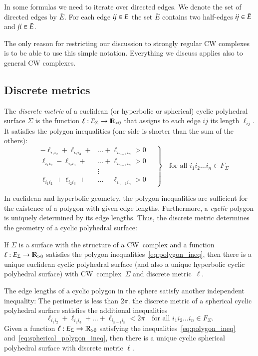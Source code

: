\documentclass[Thesis.tex]{subfiles}
\begin{document}
In some formulas we need to iterate over directed edges. We denote the set 
of directed edges by $\bar E$. For each edge $\it ij\in E$ the set $\bar E$
contains two half-edges $\it ij\in \bar E$ and $\it ji \in \bar E$.

The only reason for restricting our discussion to strongly regular CW
complexes is to be able to use this simple notation. Everything we
discuss applies also to general CW complexes.

\subsection{Discrete metrics}
\label{sec:discrete-metrics}

The \emph{discrete metric} of a euclidean (or hyperbolic or
spherical) cyclic polyhedral surface $\Sigma$ is the function
$\ell:E_{\Sigma}\rightarrow\mathbb R_{>0}$ that assigns to each edge $ij$ its
length $\ell_{ij}$. It satisfies the polygon inequalities (one side is
shorter than the sum of the others):
\begin{equation}
\label{eq:polygon_ineq}
\left.
\quad
\begin{aligned}
-\ell_{i_{1}i_{2}}+\ell_{i_{2}i_{3}}+&\ldots+\ell_{i_{n-1}i_{n}}
>0\\
\ell_{i_{1}i_{2}}-\ell_{i_{2}i_{3}}+&\ldots+\ell_{i_{n-1}i_{n}}
>0\\
&\vdots\\
\ell_{i_{1}i_{2}}+\ell_{i_{2}i_{3}}+&\ldots-\ell_{i_{n-1}i_{n}}
>0
\end{aligned}
\quad
\right\}
\quad
\text{for all $i_{1}i_{2}\ldots i_{n}\in F_{\Sigma}$}
\end{equation}

In euclidean and hyperbolic geometry, the polygon inequalities are
sufficient for the existence of a polygon with given edge
lengths. Furthermore, a \emph{cyclic} polygon is uniquely determined
by its edge lengths. Thus, the discrete metric determines the geometry
of a cyclic polyhedral surface:

If $\Sigma$ is a surface with the structure of a CW~complex and a
function $\ell:E_{\Sigma}\rightarrow\mathbb R_{>0}$ satisfies the polygon
inequalities~\eqref{eq:polygon_ineq}, then there is a unique euclidean
cyclic polyhedral surface (and also a unique hyperbolic cyclic
polyhedral surface) with CW~complex~$\Sigma$ and discrete
metric~$\ell$.

The edge lengths of a cyclic polygon in the sphere satisfy another
independent inequality: The perimeter is less than $2\pi$.  the discrete metric of a
spherical cyclic polyhedral surface satisfies the additional
inequalities
\begin{equation}
\label{eq:spherical_polygon_ineq}
\ell_{i_{1}i_{2}}+\ell_{i_{2}i_{3}}+\ldots+\ell_{i_{n-1}i_{n}}
<2\pi
\quad
\text{for all $i_{1}i_{2}\ldots i_{n}\in F_{\Sigma}$.}
\end{equation}
Given a function $\ell:E_{\Sigma}\rightarrow\mathbb R_{>0}$ satisfying the
inequalities~\eqref{eq:polygon_ineq}
and~\eqref{eq:spherical_polygon_ineq}, then there is a unique cyclic
spherical polyhedral surface with discrete metric $\ell$.
\end{document}
